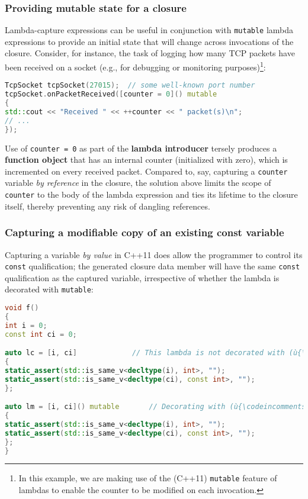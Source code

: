\subsubsection[Providing mutable state for a closure]{Providing mutable state for a closure}\label{providing-mutable-state-for-a-closure}

Lambda-capture expressions can be useful in conjunction with
\texttt{mutable} lambda expressions to provide an initial state that
will change across invocations of the closure. Consider, for instance,
the task of logging how many TCP packets have been received on a socket
(e.g., for debugging or monitoring purposes){\cprotect\footnote{In
this example, we are making use of the (C++11) \texttt{mutable} feature
of lambdas to enable the counter to be modified on each invocation.}}:

\begin{lstlisting}[language=C++]
TcpSocket tcpSocket(27015);  // some well-known port number
tcpSocket.onPacketReceived([counter = 0]() mutable
{
std::cout << "Received " << ++counter << " packet(s)\n";
// ...
});
\end{lstlisting}

\noindent Use of \texttt{counter}~\texttt{=}~\texttt{0} as part of the
\textbf{lambda introducer} tersely produces a \textbf{function object}
that has an internal counter (initialized with zero), which is
incremented on every received packet. Compared to, say, capturing a
\texttt{counter} variable \textit{by reference} in the closure, the solution
above limits the scope of \texttt{counter} to the body of the lambda
expression and ties its lifetime to the closure itself, thereby
preventing any risk of dangling references.

\subsubsection[Capturing a modifiable copy of an existing {\ttfamily const} variable]{Capturing a modifiable copy of an existing {\SubsubsecCode const} variable}\label{capturing-a-modifiable-copy-of-an-existing-const-variable}

Capturing a variable \textit{by value} in C++11 does allow the
programmer to control its \texttt{const} qualification; the generated
closure data member will have the same \texttt{const} qualification as
the captured variable, irrespective of whether the lambda is decorated
with \texttt{mutable}:

\begin{lstlisting}[language=C++]
void f()
{
int i = 0;
const int ci = 0;

auto lc = [i, ci]             // This lambda is not decorated with (ù{\codeincomments{mutable}}ù).
{
static_assert(std::is_same_v<decltype(i), int>, "");
static_assert(std::is_same_v<decltype(ci), const int>, "");
};

auto lm = [i, ci]() mutable       // Decorating with (ù{\codeincomments{mutable}}ù) has no effect.
{
static_assert(std::is_same_v<decltype(i), int>, "");
static_assert(std::is_same_v<decltype(ci), const int>, "");
};
}
\end{lstlisting}

